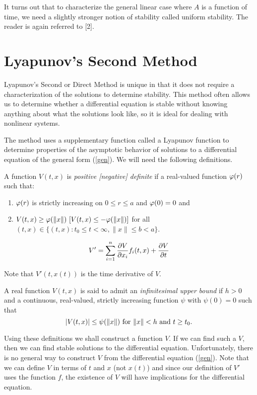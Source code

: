 \documentclass[nols]{tufte-handout}
\theoremstyle{definition}
\begin{document}
It turns out that to characterize the general linear case where $A$ is a
function of time, we need a slightly stronger notion of stability
called uniform stability.  The reader is again referred to [2].

\section{Lyapunov's Second Method}

Lyapunov's Second or Direct Method is unique in that it does not
require a characterization of the solutions to determine stability.
This method often allows us to determine whether a differential
equation is stable without knowing anything about what the solutions
look like, so it is ideal for dealing with nonlinear systems.

The method uses a supplementary function called a Lyapunov function to
determine properties of the asymptotic behavior of solutions to a
differential equation of the general form (\ref{gen}).  We will need
the following definitions.

\begin{dfn}
	A function $V(t,x)$ is {\em positive [negative]
definite} if \e a real-valued function $\varphi (r)$ such that:

\begin{enumerate}
\item $\varphi (r)$ is strictly increasing on $0 \le r \le a$ and
$\varphi (0) = 0$ and
\item $V(t,x) \ge \varphi ( \| x \| ) \ [V(t,x) \le - \varphi ( \| x \| )]$
for all $(t,x) \in \{ (t,x): t_0 \le t < \infty, \| x \| \le b < a \}$.  
\end{enumerate}

\end{dfn}
	
\begin{dfn}
	$$V' = \sum^n_{i=1} {\partial V \over \partial x_i} f_i(t,x) +
{\partial V \over \partial t}$$
\end{dfn}
Note that $V'(t,x(t))$ is the time derivative of $V$.

\begin{dfn}
	A real function $V(t,x)$ is said to admit an {\em infinitesimal upper bound} if \e
$h > 0$ and a continuous, real-valued, strictly increasing function
$\psi$ with $\psi (0) = 0$ such that 
$$|V(t,x)| \le \psi( \| x \|) \ {\rm for} \ \| x \| < h \ {\rm and} \
t \ge t_0.$$
\end{dfn}

Using these definitions we shall construct a function $V$.  If we can
find such a $V$, then we can find stable solutions to the differential
equation.  Unfortunately, there is no general way to construct $V$
from the differential equation (\ref{gen}).  Note that we can define
$V$ in terms of $t$ and $x$ (not $x(t)$) and since our definition of $V'$
uses the function $f$, the existence of $V$ will have implications for
the differential equation.
\end{document}
